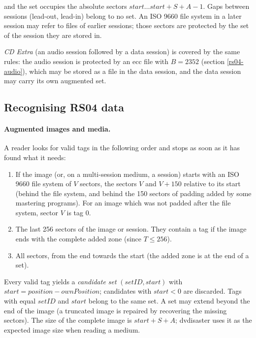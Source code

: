 and the set occupies the absolute sectors $start \ldots start + S + A - 1$.
Gaps between sessions (lead-out, lead-in) belong to no set. An ISO 9660
file system in a later session may refer to files of earlier sessions;
those sectors are protected by the set of the session they are stored in.

\medskip

{\em CD Extra} (an audio session followed by a data session) is covered by
the same rules: the audio session is protected by an ecc file with
$B = 2352$ (section \ref{rs04-audio}), which may be stored as a file in the
data session, and the data session may carry its own augmented set.

\subsection{Recognising RS04 data}
\label{rs04-recognize}

\paragraph{Augmented images and media.} A reader looks for valid tags in
the following order and stops as soon as it has found what it needs:

\begin{enumerate}
\item If the image (or, on a multi-session medium, a session) starts with an
  ISO 9660 file system of $V$ sectors, the sectors $V$ and $V+150$ relative
  to its start (behind the file system, and behind the 150 sectors of
  padding added by some mastering programs). For an image which was not
  padded after the file system, sector $V$ is tag 0.
\item The last 256 sectors of the image or session. They contain a tag if
  the image ends with the complete added zone (since $T \le 256$).
\item All sectors, from the end towards the start (the added zone is at the
  end of a set).
\end{enumerate}

Every valid tag yields a {\em candidate set} $(setID, start)$ with
$start = position - ownPosition$; candidates with $start < 0$ are
discarded. Tags with equal $setID$ and $start$ belong to the same set. A
set may extend beyond the end of the image (a truncated image is repaired by
recovering the missing sectors). The size of the complete image is
$start + S + A$; dvdisaster uses it as the expected image size when reading
a medium.

